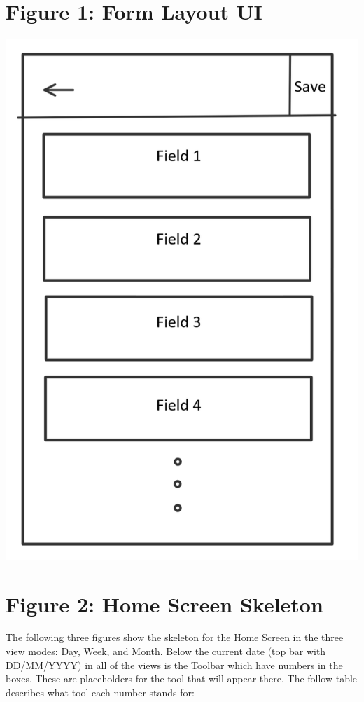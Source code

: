 \documentclass{scrreprt}
\begin{document}
\section{Figure 1: Form Layout UI}

\begin{center}
\includegraphics{eventform.PNG}
\end{center}

\section{Figure 2: Home Screen Skeleton}

The following three figures show the skeleton for the Home Screen in the three view modes: Day, Week, and Month.  Below the current date (top bar with DD/MM/YYYY) in all of the views is the Toolbar which have numbers in the boxes.  These are placeholders for the tool that will appear there.  The follow table describes what tool each number stands for:\\
\end{document}
